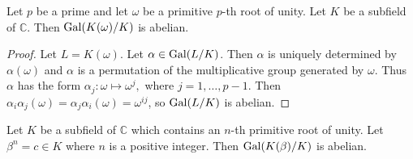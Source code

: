 %




\begin{theorem} \label{thm:radical-1}
	Let $p$ be a prime and let $\omega$ be a primitive $p$-th root of unity. Let $K$ be a subfield of $\mathbb C$. Then $\operatorname{Gal}(K(\omega) / K)$ is abelian.
\end{theorem}
\begin{proof}
	Let $L = K(\omega)$.  Let $\alpha \in \operatorname{Gal}(L / K)$. Then $\alpha$ is uniquely determined by $\alpha(\omega)$ and $\alpha$ is a permutation of the multiplicative group generated by $\omega$. Thus $\alpha$ has the form
	$
	\alpha_j: \omega \mapsto \omega^j,
	$
	where $j=1,\dots,p-1$. Then $\alpha_i \alpha_j (\omega) = \alpha_j \alpha_i (\omega) = \omega^{i j}$, so $ \operatorname{Gal}(L / K)$ is abelian.	
\end{proof}

\begin{theorem} \label{thm:radical-2}
	Let $K$ be a subfield of $\mathbb{C}$ which contains an $n$-th primitive root of unity. Let $\beta^n = c \in K $ where $n$ is a positive integer. Then $\operatorname{Gal}(K(\beta) / K)$ is abelian.
\end{theorem}

